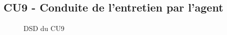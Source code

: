\subsection{CU9 - Conduite de l’entretien par l’agent}
\begin{figure}[H]
\noindent{}
\caption{DSD du CU9}
\end{figure}

